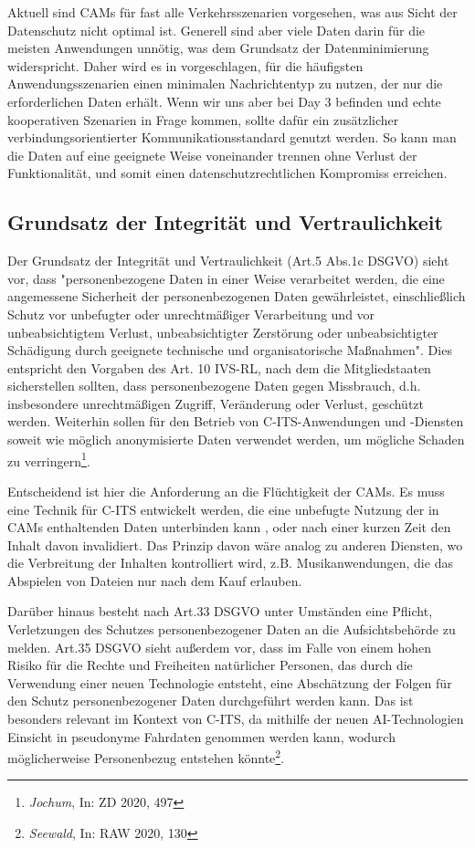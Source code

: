 Aktuell sind CAMs für fast alle Verkehrsszenarien vorgesehen, was aus Sicht der Datenschutz nicht optimal ist. Generell sind aber viele Daten darin für die meisten Anwendungen unnötig, was dem Grundsatz der Datenminimierung widerspricht. Daher wird es in \cite{Kiometzis2017} vorgeschlagen, für die häufigsten Anwendungsszenarien einen minimalen Nachrichtentyp zu nutzen, der nur die erforderlichen Daten erhält. Wenn wir uns aber bei Day 3 befinden und echte kooperativen Szenarien in Frage kommen, sollte dafür ein zusätzlicher verbindungsorientierter Kommunikationsstandard genutzt werden. So kann man die Daten auf eine geeignete Weise voneinander trennen ohne Verlust der Funktionalität, und somit einen datenschutzrechtlichen Kompromiss erreichen.

\subsection{Grundsatz der Integrität und Vertraulichkeit}

Der Grundsatz der Integrität und Vertraulichkeit (Art.5 Abs.1c DSGVO) sieht vor, dass "personenbezogene Daten in einer Weise verarbeitet werden, die eine angemessene Sicherheit der personenbezogenen Daten gewährleistet, einschließlich Schutz vor unbefugter oder unrechtmäßiger Verarbeitung und vor unbeabsichtigtem Verlust, unbeabsichtigter Zerstörung oder unbeabsichtigter Schädigung durch geeignete technische und organisatorische Maßnahmen". Dies entspricht den Vorgaben des Art. 10 IVS-RL, nach dem die Mitgliedstaaten sicherstellen sollten, dass personenbezogene Daten gegen Missbrauch, d.h. insbesondere unrechtmäßigen Zugriff, Veränderung oder Verlust, geschützt werden. Weiterhin sollen für den Betrieb von C-ITS-Anwendungen und -Diensten soweit wie möglich anonymisierte Daten verwendet werden, um mögliche Schaden zu verringern\footnote{\emph{Jochum}, In: ZD 2020, 497}. 

Entscheidend ist hier die Anforderung an die Flüchtigkeit der CAMs. Es muss eine Technik für C-ITS entwickelt werden, die eine unbefugte Nutzung der in CAMs enthaltenden Daten unterbinden kann \cite{Kiometzis2017}, oder nach einer kurzen Zeit den Inhalt davon invalidiert. Das Prinzip davon wäre analog zu anderen Diensten, wo die Verbreitung der Inhalten kontrolliert wird, z.B. Musikanwendungen, die das Abspielen von Dateien nur nach dem Kauf erlauben. 

Darüber hinaus besteht nach Art.33 DSGVO unter Umständen eine Pflicht, Verletzungen des Schutzes personenbezogener Daten an die Aufsichtsbehörde zu melden. Art.35 DSGVO sieht außerdem vor, dass im Falle von einem hohen Risiko für die Rechte und Freiheiten natürlicher Personen, das durch die Verwendung einer neuen Technologie entsteht, eine Abschätzung der Folgen für den Schutz personenbezogener Daten durchgeführt werden kann. Das ist besonders relevant im Kontext von C-ITS, da mithilfe der neuen AI-Technologien Einsicht in pseudonyme Fahrdaten genommen werden kann, wodurch möglicherweise Personenbezug entstehen könnte\footnote{\emph{Seewald}, In: RAW 2020, 130}. 

